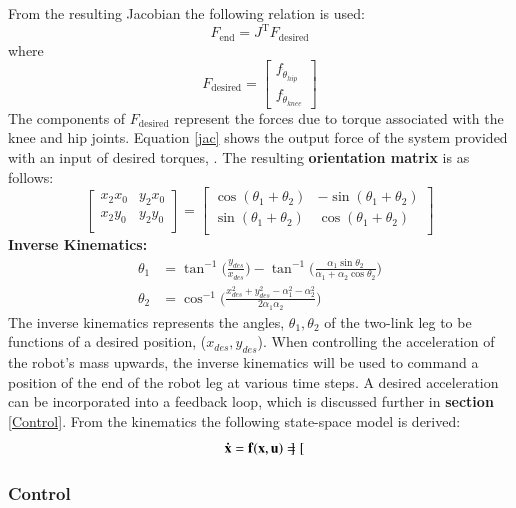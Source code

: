 \noindent From the resulting Jacobian the following relation is used:
\begin{equation}\label{jac}
    F_\text{end} = J^\text{T}F_\text{desired}
\end{equation}
\noindent where 
\begin{equation}
    F_\text{desired} = 
    \begin{bmatrix}
        f_{\dot{\theta}_{hip}}\\
        f_{\dot{\theta}_{knee}}
    \end{bmatrix}
\end{equation}
\noindent The components of $F_\text{desired}$ represent the forces due to torque associated with the knee and hip joints. Equation \ref{jac} shows the output force of the system provided with an input of desired torques, \cite{spong_robot_nodate}.
\noindent The resulting \textbf{orientation matrix} is as follows:
\begin{equation}
    \begin{bmatrix}
        x_2x_0 & y_2x_0\\
        x_2y_0 & y_2y_0\\
    \end{bmatrix}
    = 
    \begin{bmatrix}
        \cos(\theta_1 + \theta_2) & -\sin(\theta_1 + \theta_2)\\
        \sin(\theta_1 + \theta_2) & \cos(\theta_1 + \theta_2)\\
    \end{bmatrix}
\end{equation}
\textbf{Inverse Kinematics:}
\begin{align}
    \theta_1 & = \tan^{-1}\bigg(\frac{y_{des}}{x_{des}}\bigg)-\tan^{-1}\bigg(\frac{\alpha_1\sin\theta_2}{\alpha_1+\alpha_2\cos\theta_2}\bigg)\\
    \theta_2 &= \cos^{-1}\bigg(\frac{x_{des}^2 + y_{des}^2 - \alpha_1^2 - \alpha_2^2}{2\alpha_1\alpha_2}\bigg)
\end{align}
\indent The inverse kinematics represents the angles, $\theta_1, \theta_2$ of the two-link leg to be functions of a desired position, ($x_{des}, y_{des}$). When controlling the acceleration of the robot's mass upwards, the inverse kinematics will be used to command a position of the end of the robot leg at various time steps. A desired acceleration can be incorporated into a feedback loop, which is discussed further in \textbf{section} \ref{Control}. From the kinematics the following state-space model is derived:\\
\begin{equation}
    \bf{\dot{x}} = \bf{f}(\bf{x,u}) = 
    \begin{bmatrix}
        
    \end{bmatrix}
\end{equation}


\subsubsection{Control}